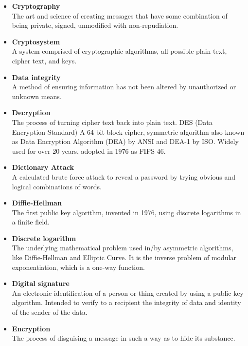 \begin{itemize}
\item \textbf{Cryptography}\\
The art and science of creating messages that have some combination of being private, signed, unmodified with non-repudiation.

\item \textbf{Cryptosystem}\\
A system comprised of cryptographic algorithms, all possible plain text, cipher text, and keys.

\item \textbf{Data integrity}\\
A method of ensuring information has not been altered by unauthorized or unknown means.

\item \textbf{Decryption}\\
The process of turning cipher text back into plain text. DES (Data Encryption Standard) A 64-bit block cipher, symmetric algorithm also known as Data Encryption Algorithm (DEA) by ANSI and DEA-1 by ISO. Widely used for over 20 years, adopted in 1976 as FIPS 46.

\item \textbf{Dictionary Attack}\\
A calculated brute force attack to reveal a password by trying obvious and logical combinations of words.

\item \textbf{Diffie-Hellman}\\
The first public key algorithm, invented in 1976, using discrete logarithms in a finite field.

\item \textbf{Discrete logarithm}\\
The underlying mathematical problem used in/by asymmetric algorithms, like Diffie-Hellman and Elliptic Curve. It is the inverse problem of modular exponentiation, which is a one-way function.

\item \textbf{Digital signature}\\
An electronic identification of a person or thing created by using a public key algorithm. Intended to verify to a recipient the integrity of data and identity of the sender of the data.

\item \textbf{Encryption}\\
The process of disguising a message in such a way as to hide its substance.


\end{itemize}
